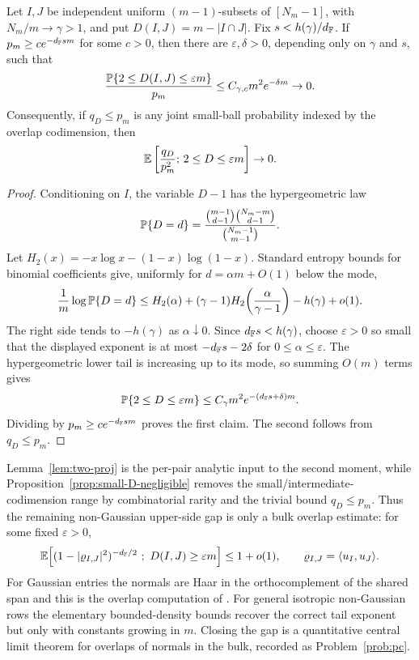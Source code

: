 \begin{proposition}\label{prop:small-D-negligible}
Let \(I,J\) be independent uniform \((m-1)\)-subsets of \([N_m-1]\), with
\(N_m/m\to\gamma>1\), and put \(D(I,J)=m-|I\cap J|\).  Fix
\(s<h(\gamma)/d_{\mathbb{F}}\).  If \(p_m\ge c e^{-d_{\mathbb{F}} s m}\) for some \(c>0\), then
there are \(\varepsilon,\delta>0\), depending only on \(\gamma\) and \(s\), such
that
\[
  \frac{\mathbb{P}\{2\le D(I,J)\le \varepsilon m\}}{p_m}
  \le C_{\gamma,c}m^2 e^{-\delta m}\to0 .
\]
Consequently, if \(q_D\le p_m\) is any joint small-ball probability indexed by
the overlap codimension, then
\[
  \mathbb{E}\left[\frac{q_D}{p_m^2};\,2\le D\le\varepsilon m\right]\to0 .
\]
\end{proposition}

\begin{proof}
Conditioning on \(I\), the variable \(D-1\) has the hypergeometric law
\[
  \mathbb{P}\{D=d\}=
  \frac{\binom{m-1}{d-1}\binom{N_m-m}{d-1}}{\binom{N_m-1}{m-1}} .
\]
Let \(H_2(x)=-x\log x-(1-x)\log(1-x)\).  Standard entropy bounds for binomial
coefficients give, uniformly for \(d=\alpha m+O(1)\) below the mode,
\[
  \frac1m\log \mathbb{P}\{D=d\}
  \le H_2(\alpha)+(\gamma-1)H_2\!\left(\frac{\alpha}{\gamma-1}\right)
       -h(\gamma)+o(1).
\]
The right side tends to \(-h(\gamma)\) as \(\alpha\downarrow0\).  Since
\(d_{\mathbb{F}} s<h(\gamma)\), choose \(\varepsilon>0\) so small that the displayed
exponent is at most \(-d_{\mathbb{F}} s-2\delta\) for \(0\le\alpha\le\varepsilon\).  The
hypergeometric lower tail is increasing up to its mode, so summing
\(O(m)\) terms gives
\[
  \mathbb{P}\{2\le D\le\varepsilon m\}\le C_\gamma m^2 e^{-(d_{\mathbb{F}} s+\delta)m}.
\]
Dividing by \(p_m\ge c e^{-d_{\mathbb{F}} s m}\) proves the first claim.  The second
follows from \(q_D\le p_m\).
\end{proof}

\begin{remark}\label{rem:pc-reduction}
Lemma~\ref{lem:two-proj} is the per-pair analytic input to the second moment,
while Proposition~\ref{prop:small-D-negligible} removes the
small/intermediate-codimension range by combinatorial rarity and the trivial
bound \(q_D\le p_m\).  Thus the remaining non-Gaussian upper-side gap is only a
bulk overlap estimate: for some fixed \(\varepsilon>0\),
\[
  \EE\!\left[(1-|\varrho_{I,J}|^2)^{-d_\F/2}\ ;\ D(I,J)\ge\varepsilon m\right]
  \le 1+o(1),
  \qquad \varrho_{I,J}=\langle u_I,u_J\rangle .
\]
For Gaussian entries the normals are Haar in the orthocomplement of the shared
span and this is the overlap computation of \cite{ShmaloExtremal2026}.  For
general isotropic non-Gaussian rows the elementary bounded-density bounds recover
the correct tail exponent but only with constants growing in \(m\).  Closing the
gap is a quantitative central limit theorem for overlaps of normals in the bulk,
recorded as Problem~\ref{prob:pc}.
\end{remark}
